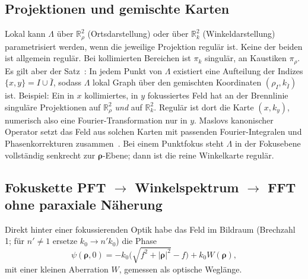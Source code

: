 \documentclass[11pt,a4paper]{scrartcl}
\theoremstyle{insightstyle}
\newcommand{\R}{\mathbb{R}}
\newcommand{\rh}{\bm{\rho}}
\begin{document}
\subsection{Projektionen und gemischte Karten}\label{sec:charts}
Lokal kann $\Lambda$ über $\R^2_\rho$ (Ortsdarstellung) oder über $\R^2_k$ (Winkeldarstellung) parametrisiert werden, wenn die jeweilige Projektion regulär ist. Keine der beiden ist allgemein regulär. Bei kollimierten Bereichen ist $\pi_k$ singulär, an Kaustiken $\pi_\rho$. Es gilt aber der Satz~\cite{arnold1967,maslov1981}: In jedem Punkt von $\Lambda$ existiert eine Aufteilung der Indizes $\{x,y\}=I\cup\bar I$, sodass $\Lambda$ lokal Graph über den gemischten Koordinaten $(\rho_I,k_{\bar I})$ ist. Beispiel: Ein in $x$ kollimiertes, in $y$ fokussiertes Feld hat an der Brennlinie singuläre Projektionen auf $\R^2_\rho$ \emph{und} auf $\R^2_k$. Regulär ist dort die Karte $(x,k_y)$, numerisch also eine Fourier-Transformation nur in $y$. Maslovs kanonischer Operator setzt das Feld aus solchen Karten mit passenden Fourier-Integralen und Phasenkorrekturen zusammen~\cite{maslov1981,kravtsov1993,littlejohn1986}. Bei einem Punktfokus steht $\Lambda$ in der Fokusebene vollständig senkrecht zur $\rh$-Ebene; dann ist die reine Winkelkarte regulär.

\subsection{Fokuskette PFT $\to$ Winkelspektrum $\to$ FFT ohne paraxiale Näherung}\label{sec:focus}
Direkt hinter einer fokussierenden Optik habe das Feld im Bildraum (Brechzahl 1; für $n'\neq1$ ersetze $k_0\to n'k_0$) die Phase
\begin{equation}
    \psi(\rh,0) = -k_0\big(\sqrt{f^2+|\rh|^2}-f\big) + k_0W(\rh),
    \label{eq:lens_exit_field}
\end{equation}
mit einer kleinen Aberration $W$, gemessen als optische Weglänge.
\end{document}
